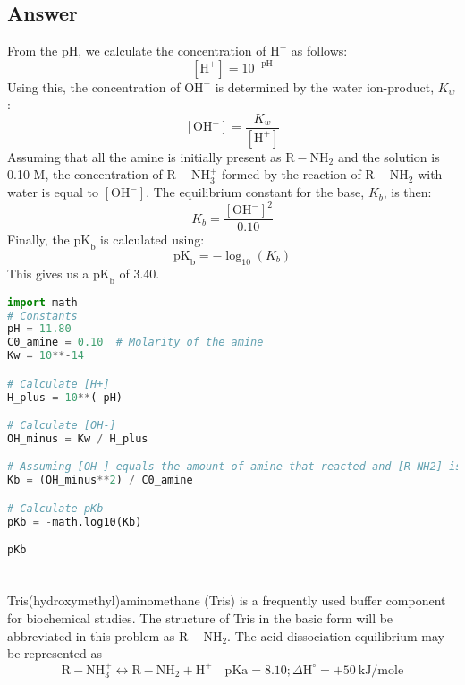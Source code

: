 \documentclass[12pt]{article}
\begin{document}
\subsection{Answer}
From the pH, we calculate the concentration of $\mathrm{H}^{+}$ as follows:
\begin{equation}
  \left[\mathrm{H}^{+}\right] = 10^{-\mathrm{pH}}
\end{equation}
Using this, the concentration of $\mathrm{OH}^{-}$ is determined by the water ion-product, $K_{w}$:
\begin{equation}
  \left[\mathrm{OH}^{-}\right] = \frac{K_{w}}{\left[\mathrm{H}^{+}\right]}
\end{equation}
Assuming that all the amine is initially present as $\mathrm{R}-\mathrm{NH}_{2}$ and the solution is 0.10 M, the concentration of $\mathrm{R}-\mathrm{NH}_{3}^{+}$ formed by the reaction of $\mathrm{R}-\mathrm{NH}_{2}$ with water is equal to $\left[\mathrm{OH}^{-}\right]$. The equilibrium constant for the base, $K_{b}$, is then:
\begin{equation}
  K_{b} = \frac{\left[\mathrm{OH}^{-}\right]^{2}}{0.10}
\end{equation}
Finally, the $\mathrm{pK}_\mathrm{b}$ is calculated using:
\begin{equation}
  \mathrm{pK}_\mathrm{b} = -\log_{10}(K_{b})
\end{equation}
This gives us a $\mathrm{pK}_\mathrm{b}$ of 3.40.
\begin{lstlisting}[language=Python]
import math
# Constants
pH = 11.80
C0_amine = 0.10  # Molarity of the amine
Kw = 10**-14

# Calculate [H+]
H_plus = 10**(-pH)

# Calculate [OH-]
OH_minus = Kw / H_plus

# Assuming [OH-] equals the amount of amine that reacted and [R-NH2] is approximately equal to the initial concentration
Kb = (OH_minus**2) / C0_amine

# Calculate pKb
pKb = -math.log10(Kb)

pKb

\end{lstlisting}

\section{}
Tris(hydroxymethyl)aminomethane (Tris) is a frequently used buffer component for biochemical studies. The structure of Tris in the basic form will be abbreviated in this problem as $\mathrm{R}-\mathrm{NH}_{2}$. The acid dissociation equilibrium may be represented as
$$
\mathrm{R}-\mathrm{NH}_{3}^{+} \leftrightarrow \mathrm{R}-\mathrm{NH}_{2}+\mathrm{H}^{+} \quad \mathrm{pKa}=8.10 ; \Delta \mathrm{H}^{\circ}=+50 \mathrm{~kJ} / \mathrm{mole}
$$
\end{document}
